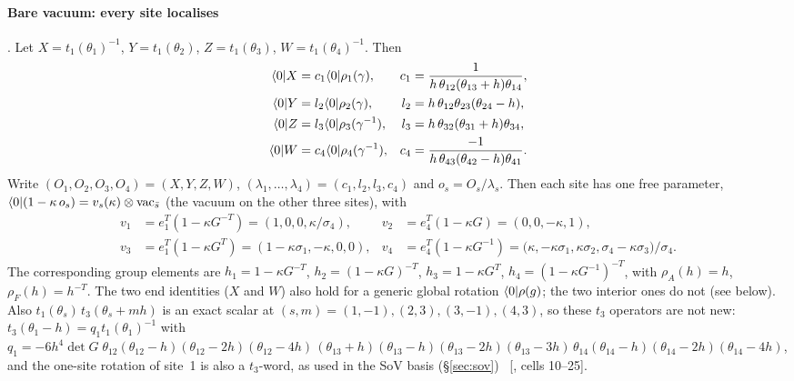\paragraph{Bare vacuum: every site localises} \ex. Let $X=t_1(\theta_1)^{-1}$, $Y=t_1(\theta_2)$, $Z=t_1(\theta_3)$,
$W=t_1(\theta_4)^{-1}$. Then
\begin{align}
 \langle0|X&=c_1\langle0|\rho_1(\gamma), & c_1&=\frac1{h\,\theta_{12}(\theta_{13}+h)\theta_{14}},\nonumber\\
 \langle0|Y&=l_2\langle0|\rho_2(\gamma), & l_2&=h\,\theta_{12}\theta_{23}(\theta_{24}-h),\nonumber\\
 \langle0|Z&=l_3\langle0|\rho_3(\gamma^{-1}), & l_3&=h\,\theta_{32}(\theta_{31}+h)\theta_{34},\nonumber\\
 \langle0|W&=c_4\langle0|\rho_4(\gamma^{-1}), & c_4&=\frac{-1}{h\,\theta_{43}(\theta_{42}-h)\theta_{41}}.
\end{align}
Write $(O_1,O_2,O_3,O_4)=(X,Y,Z,W)$, $(\lambda_1,\dots,\lambda_4)=(c_1,l_2,l_3,c_4)$ and $o_s=O_s/\lambda_s$. Then each site has one free
parameter, $\langle0|(1-\kappa\,o_s)=v_s(\kappa)\otimes\mathrm{vac}_{\bar s}$ (the vacuum on the other three sites), with
\begin{align}
 v_1&=e_1^T(1-\kappa G^{-T})=(1,0,0,\kappa/\sigma_4), & v_2&=e_4^T(1-\kappa G)=(0,0,-\kappa,1),\nonumber\\
 v_3&=e_1^T(1-\kappa G^{T})=(1-\kappa\sigma_1,-\kappa,0,0), &
 v_4&=e_4^T(1-\kappa G^{-1})=\big(\kappa,-\kappa\sigma_1,\kappa\sigma_2,\sigma_4-\kappa\sigma_3\big)/\sigma_4 .
\end{align}
The corresponding group elements are $h_1=1-\kappa G^{-T}$, $h_2=(1-\kappa G)^{-T}$, $h_3=1-\kappa G^T$, $h_4=(1-\kappa G^{-1})^{-T}$, with
$\rho_A(h)=h$, $\rho_F(h)=h^{-T}$. The two end identities ($X$ and $W$) also hold for a generic global rotation $\langle0|\rho(g)$; the two interior ones do not (see below).
Also $t_1(\theta_s)\,t_3(\theta_s+mh)$ is an exact scalar at $(s,m)=(1,-1),(2,3),(3,-1),(4,3)$, so these $t_3$ operators are not new:
$t_3(\theta_1-h)=q_1t_1(\theta_1)^{-1}$ with
$q_1=-6h^4\det G\;\theta_{12}(\theta_{12}-h)(\theta_{12}-2h)(\theta_{12}-4h)\,(\theta_{13}+h)(\theta_{13}-h)(\theta_{13}-2h)(\theta_{13}-3h)\,
\theta_{14}(\theta_{14}-h)(\theta_{14}-2h)(\theta_{14}-4h)$, and the one-site rotation of site~1 is also a $t_3$-word, as used in
the SoV basis (\S\ref{sec:sov}) \ex\ [, cells 10--25].

